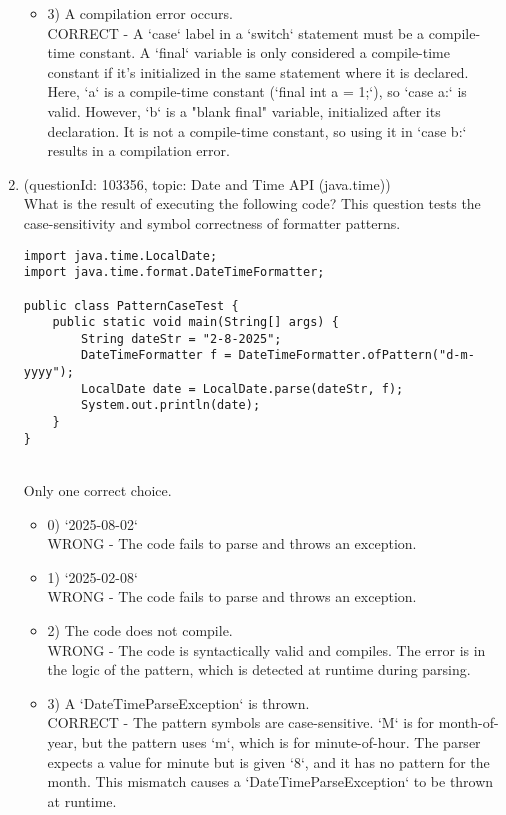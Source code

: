 \documentclass[12pt]{article}
\begin{document}
\begin{enumerate}[label=(\arabic*)]
\begin{itemize}
\item 3) A compilation error occurs.
 \\ 
CORRECT - A `case` label in a `switch` statement must be a compile-time constant. A `final` variable is only considered a compile-time constant if it's initialized in the same statement where it is declared. Here, `a` is a compile-time constant (`final int a = 1;`), so `case a:` is valid. However, `b` is a "blank final" variable, initialized after its declaration. It is not a compile-time constant, so using it in `case b:` results in a compilation error.

\end{itemize}
\item (questionId: 103356, topic: Date and Time API (java.time)) \\ 
What is the result of executing the following code? This question tests the case-sensitivity and symbol correctness of formatter patterns.
\begin{verbatim}
import java.time.LocalDate;
import java.time.format.DateTimeFormatter;

public class PatternCaseTest {
    public static void main(String[] args) {
        String dateStr = "2-8-2025";
        DateTimeFormatter f = DateTimeFormatter.ofPattern("d-m-yyyy");
        LocalDate date = LocalDate.parse(dateStr, f);
        System.out.println(date);
    }
}
\end{verbatim}
\\ \noindent Only one correct choice. 
\begin{itemize}
\item 0) `2025-08-02`
 \\ 
WRONG - The code fails to parse and throws an exception.

\item 1) `2025-02-08`
 \\ 
WRONG - The code fails to parse and throws an exception.

\item 2) The code does not compile.
 \\ 
WRONG - The code is syntactically valid and compiles. The error is in the logic of the pattern, which is detected at runtime during parsing.

\item 3) A `DateTimeParseException` is thrown.
 \\ 
CORRECT - The pattern symbols are case-sensitive. `M` is for month-of-year, but the pattern uses `m`, which is for minute-of-hour. The parser expects a value for minute but is given `8`, and it has no pattern for the month. This mismatch causes a `DateTimeParseException` to be thrown at runtime.


\end{itemize}
\end{enumerate}
\end{document}
